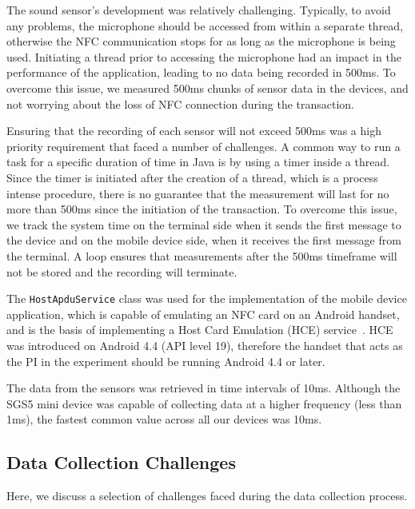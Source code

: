 \documentclass{article}
\begin{document}
The sound sensor's development was relatively challenging. Typically, to avoid any problems, the microphone should be accessed from within a separate thread, otherwise the NFC communication stops for as long as the microphone is being used. Initiating a thread prior to accessing the microphone had an impact in the performance of the application, leading to no data being recorded in 500ms. To overcome this issue, we measured 500ms chunks of sensor data in the devices, and not worrying about the loss of NFC connection during the transaction.

Ensuring that the recording of each sensor will not exceed 500ms was a high priority requirement that faced a number of challenges. A common way to run a task for a specific duration of time in Java is by using a timer inside a thread. Since the timer is initiated after the creation of a thread, which is a process intense procedure, there is no guarantee that the measurement will last for no more than 500ms since the initiation of the transaction. To overcome this issue, we track the system time on the terminal side when it sends the first message to the device and on the mobile device side, when it receives the first message from the terminal. A loop ensures that measurements after the 500ms timeframe will not be stored and the recording will terminate.

The \texttt{HostApduService} class was used for the implementation of the mobile device application, which is capable of emulating an NFC card on an Android handset, and is the basis of implementing a Host Card Emulation (HCE) service~\cite{hce}.
		HCE was introduced on Android 4.4 (API level 19), therefore the handset that acts as the PI in the experiment should be running Android 4.4 or later.

The data from the sensors was retrieved in time intervals of 10ms.
		Although the SGS5 mini device was capable of collecting data at a higher frequency (less than 1ms), the fastest common value across all our devices was 10ms.



\subsection{Data Collection Challenges}
Here, we discuss a selection of challenges faced during the data collection process. 
\end{document}
